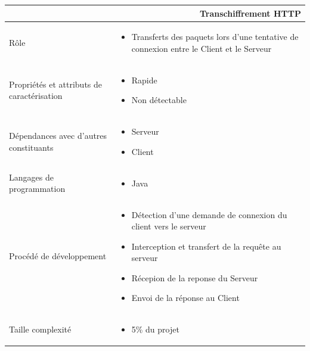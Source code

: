 \documentclass[a4paper,11pt,french]{article}
\begin{document}
\begin{center}
        \vspace*{0.7cm}
        \begin{tabularx}{16cm}{|l|X|}
        \hline
        \multicolumn{2}{|r|}{\textbf{Transchiffrement HTTP}}\\
        \hline
        R\^ole &  \begin{itemize}\item Transferts des paquets lors d'une tentative de connexion entre le Client et le Serveur \end{itemize}\\
        \hline
        Propriétés et attributs de caractérisation & \begin{itemize} \item Rapide \item Non détectable\end{itemize}\\
        \hline
        Dépendances avec d'autres constituants & \begin{itemize}\item Serveur \item Client\end{itemize}\\
        \hline
        Langages de programmation & \begin{itemize} \item Java \end{itemize}\\
        \hline
        Procédé de développement & \begin{itemize}\item Détection d'une demande de connexion du client vers le serveur \item Interception et transfert de la requête au serveur \item Récepion de la reponse du Serveur \item Envoi de la réponse au Client
        \end{itemize}\\
        \hline
        Taille complexité & \begin{itemize}\item 5\% du projet  \end{itemize}\\
        \hline
        \end{tabularx}
\end{center}
\end{document}
